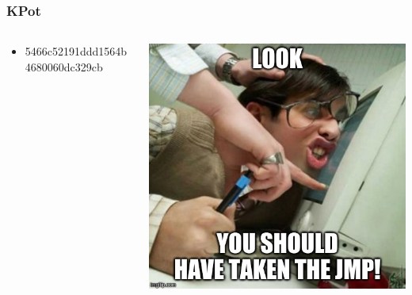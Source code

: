 \documentclass[aspectratio=169]{beamer}
\begin{document}
\begin{frame}
  \frametitle{KPot}
  \begin{columns}
    \begin{column}{.5\textwidth}
      \begin{itemize}
      \item{5466c52191ddd1564b4680060dc329cb}
      \end{itemize}
    \end{column}
    \hfill
    \begin{column}{.5\textwidth}
      \begin{center}
        \includegraphics[scale=0.38]{jmp-meme}
      \end{center}
    \end{column}
  \end{columns}
\end{frame}
\end{document}
